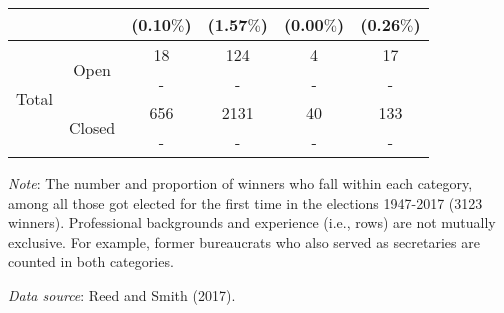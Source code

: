 \begin{table}[H]
\begin{threeparttable}
\begin{tabular}{cccccc}
    & & (0.10$\%$) & (1.57$\%$) & (0.00$\%$) & (0.26$\%$) \\ \midrule[0.7pt]
    \multirow{4}{*}{Total} & \multirow{2}{*}{Open} & 18 & 124 & 4 & 17 \\
    & & - & - & - & - \\ 
    & \multirow{2}{*}{Closed} & 656 & 2131 & 40 & 133 \\
    & & - & - & - & - \\ \bottomrule
  \end{tabular}
  \begin{tablenotes}[flushleft]
    \scriptsize{
      \item \textit{Note}: The number and proportion of winners who fall within each category, among all those got elected for the first time in the elections 1947-2017 (3123 winners). Professional backgrounds and experience (i.e., rows) are not mutually exclusive. For example, former bureaucrats who also served as secretaries are counted in both categories.
      \item \textit{Data source}: Reed and Smith (2017).
    }
  \end{tablenotes}
\end{threeparttable}
\end{table}


